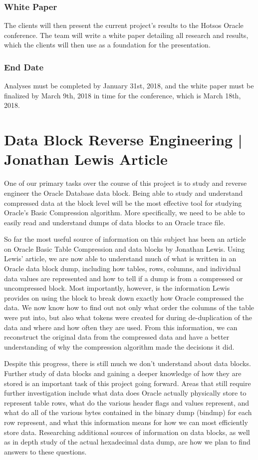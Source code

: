 \documentclass[10pt]{article}
\begin{document}
\subsubsection{White Paper}
The clients will then present the current project's results to the Hotsos Oracle conference. The team will write a white paper detailing all research and results, which the clients will then use as a foundation for the presentation.  
\subsubsection{End Date}
Analyses must be completed by January 31st, 2018, and the white paper must be finalized by March 9th, 2018 in time for the conference, which is March 18th, 2018. 

\section{Data Block Reverse Engineering | Jonathan Lewis Article}
One of our primary tasks over the course of this project is to study and reverse engineer the Oracle Database data block. Being able to study and understand compressed data at the block level will be the most effective tool for studying Oracle's Basic Compression algorithm. More specifically, we need to be able to easily read and 
understand dumps of data blocks to an Oracle trace file.

So far the most useful source of information on this subject has been an article on Oracle Basic Table Compression and data blocks by Jonathan Lewis. Using Lewis' article, we are now able to understand much of what is written in an Oracle data block dump, including how tables, rows, columns, and individual data values are represented and how to tell if a dump is from a compressed or uncompressed block. Most importantly, however, is the information Lewis provides on using the block to break down exactly how Oracle compressed the data. We now know how to find out not only what order the columns of the table were put into, but also what tokens were created for during de-duplication of the data and where and how often they are used. From this information, we can reconstruct the original data from the compressed data and have a better understanding of why the compression algorithm made the decisions it did. 

Despite this progress, there is still much we don't understand about data blocks. Further study of data blocks and gaining a deeper knowledge of how they are stored is an important task of this project going forward. Areas that still require further investigation include what data does Oracle actually physically store to represent table rows, what do the various header flags and values represent, and what do all of the various bytes contained in the binary dump (bindmp) for each row represent, and what this information means for how we can most efficiently store data. Researching additional sources of information on data blocks, as well as in depth study of the actual hexadecimal data dump, are how we plan to find answers to these questions.
\end{document}
